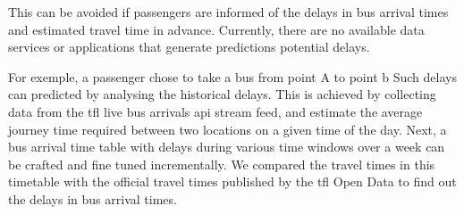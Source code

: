 
\par This can be avoided if passengers are informed of the delays in bus arrival times and estimated travel time in advance. Currently, there are no available data services or applications that generate predictions potential delays.

For exemple, a passenger chose to take a bus from point A to point b
 Such delays can predicted by analysing the historical delays. This is achieved by collecting data from the \acrshort{tfl} live bus arrivals \acrfull{api} stream feed\cite{live_bus_arrivals}, and estimate the average journey time required between two locations on a given time of the day. Next, a bus arrival time table with delays during various time windows over a week can be crafted and fine tuned incrementally. We compared the travel times in this timetable with the official travel times published by the \acrshort{tfl} Open Data to find out the delays in bus arrival times.
